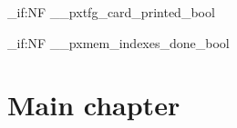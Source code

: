 \documentclass[TFG,MEM,CAT]{P3CTeX}
\begin{document}
\ExplSyntaxOn
\bool_if:NF \g__pxtfg_card_printed_bool
  {\PackageError{pxTFG.MEM.test}{TFG card was not printed automatically}{}}
\bool_if:NF \g__pxmem_indexes_done_bool
  {\PackageError{pxTFG.MEM.test}{MEM indexes were not printed automatically}{}}
\ExplSyntaxOff
{}
\chapter{Main chapter}
\end{document}

